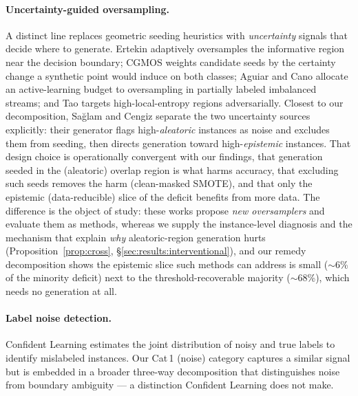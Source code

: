\paragraph{Uncertainty-guided oversampling.}
A distinct line replaces geometric seeding heuristics with \emph{uncertainty}
signals that decide where to generate. Ertekin \cite{ertekin2013adaptive}
adaptively oversamples the informative region near the decision boundary;
CGMOS \cite{zhang2016cgmos} weights candidate seeds by the certainty change a
synthetic point would induce on both classes; Aguiar and Cano
\cite{aguiar2023active} allocate an active-learning budget to oversampling in
partially labeled imbalanced streams; and Tao \cite{tao2026local} targets
high-local-entropy regions adversarially. Closest to our decomposition,
Sa{\u{g}}lam and Cengiz \cite{saglam2026uncertainty} separate the two
uncertainty sources explicitly: their generator flags high-\emph{aleatoric}
instances as noise and excludes them from seeding, then directs generation
toward high-\emph{epistemic} instances. That design choice is operationally
convergent with our findings, that generation seeded in the (aleatoric)
overlap region is what harms accuracy, that excluding such seeds removes the
harm (clean-masked SMOTE), and that only the epistemic (data-reducible) slice
of the deficit benefits from more data. The difference is the object of study:
these works propose \emph{new oversamplers} and evaluate them as methods,
whereas we supply the instance-level diagnosis and the mechanism that explain
\emph{why} aleatoric-region generation hurts
(Proposition~\ref{prop:cross}, \S\ref{sec:results:interventional}), and our
remedy decomposition shows the epistemic slice such methods can address is
small ($\sim$6\% of the minority deficit) next to the threshold-recoverable
majority ($\sim$68\%), which needs no generation at all.

\paragraph{Label noise detection.}
Confident Learning \cite{northcutt2021confident} estimates the joint
distribution of noisy and true labels to identify mislabeled instances. Our
Cat\,1 (noise) category captures a similar signal but is embedded in a
broader three-way decomposition that distinguishes noise from boundary
ambiguity --- a distinction Confident Learning does not make.

